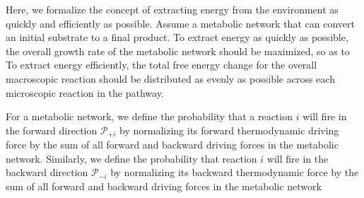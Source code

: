 Here, we formalize the concept of extracting energy from the environment as quickly and efficiently as possible. Assume a metabolic network that can convert an initial substrate to a final product. To extract energy as quickly as possible, the overall growth rate of the metabolic network should be maximized, so as to   To extract energy efficiently, the total free energy change for the overall macroscopic reaction should be distributed as evenly as possible across each microscopic reaction in the pathway.


For a metabolic network, we define the probability that a reaction $i$ will fire in the forward  direction ${\mathcal P_{+i}}$ by normalizing its forward thermodynamic driving force by the sum of all forward and backward driving forces in the metabolic network. Similarly, we define the probability that reaction $i$ will fire in the backward direction $\mathcal P_{-i}$ by normalizing its backward thermodynamic force by  the sum of all forward and backward driving forces in the metabolic network